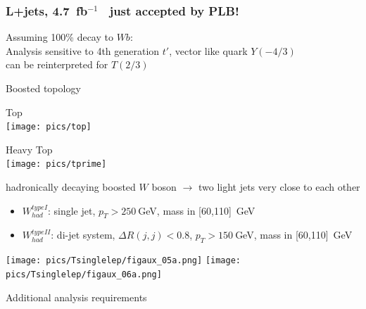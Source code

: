 \documentclass[xcolor=dvipsnames,10pt]{beamer}
\begin{document}
\begin{frame}\frametitle{L+jets, 4.7~fb$^{-1}$~\cite{ATLAS:2012qe} {\small just accepted by PLB!}} %
\footnotesize\centering


\begin{minipage}{.4\textwidth}
\centering
Assuming 100\% decay to $Wb$:\\
{\scriptsize
Analysis sensitive to \alert{4th generation $t'$}, \alert{vector like quark $Y(-4/3)$}\\
can be reinterpreted for \alert{$T(2/3)$}
}

\vspace{\baselineskip}

\alert{Boosted topology}

\begin{minipage}{.5\textwidth}\centering
Top\\
\texttt{[image: pics/top]} 
\end{minipage}\begin{minipage}{.5\textwidth}\centering
\vspace{\baselineskip}
Heavy Top\\
\texttt{[image: pics/tprime]}
\end{minipage}

\vspace{\baselineskip}

\scriptsize
hadronically decaying boosted $W$ boson $\rightarrow$ two light jets very close to each other

\vspace{\baselineskip}

\begin{itemize}
\item \alert{$W^{type I}_{had}$}: single jet, $p_T>250~$GeV, mass in [60,110]~GeV
\item \alert{$W^{type II}_{had}$}: di-jet system, $\Delta R(j,j)<0.8$, $p_T>150~$GeV, mass in [60,110]~GeV
\end{itemize}

\vspace{\baselineskip}

\end{minipage}\begin{minipage}{.6\textwidth}
\centering

\texttt{[image: pics/Tsinglelep/figaux\_05a.png]}
\texttt{[image: pics/Tsinglelep/figaux\_06a.png]}


Additional analysis requirements


\end{minipage}
\end{frame}
\end{document}

